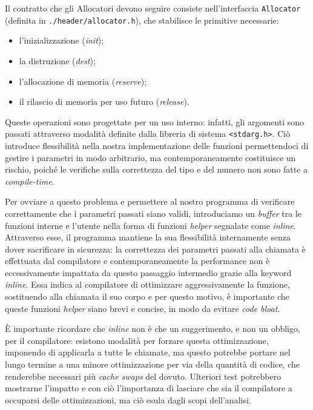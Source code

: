 \documentclass[noexaminfo]{sapthesis}
\begin{document}
Il contratto che gli Allocatori devono seguire consiste nell’interfaccia \texttt{Allocator} (definita in \texttt{./header/allocator.h}), che stabilisce le primitive necessarie:
\begin{itemize}
  \item l’inizializzazione (\textit{init});
  \item la distruzione (\textit{dest});
  \item l’allocazione di memoria (\textit{reserve});
  \item il rilascio di memoria per uso futuro (\textit{release}).
\end{itemize}
Queste operazioni sono progettate per un uso interno: infatti, gli argomenti sono passati attraverso modalità definite dalla libreria di sistema \texttt{<stdarg.h>}. Ciò introduce flessibilità nella nostra implementazione delle funzioni permettendoci di gestire i parametri in modo arbitrario, ma contemporaneamente costituisce un rischio, poiché le verifiche sulla correttezza del tipo e del numero non sono fatte a \textit{compile-time}.

Per ovviare a questo problema e permettere al nostro programma di verificare correttamente che i parametri passati siano validi, introduciamo un \textit{buffer} tra le funzioni interne e l’utente nella forma di funzioni \textit{helper} segnalate come \textit{inline}. Attraverso esse, il programma mantiene la sua flessibilità internamente senza dover sacrificare in sicurezza: la correttezza dei parametri passati alla chiamata è effettuata dal compilatore e contemporaneamente la performance non è eccessivamente impattata da questo passaggio intermedio grazie alla keyword \textit{inline}. Essa indica al compilatore di ottimizzare aggressivamente la funzione, sostituendo alla chiamata il suo corpo e per questo motivo, è importante che queste funzioni \textit{helper} siano brevi e concise, in modo da evitare \textit{code bloat}.

È importante ricordare che \textit{inline} non è che un suggerimento, e non un obbligo, per il compilatore: esistono modalità per forzare questa ottimizzazione, imponendo di applicarla a tutte le chiamate, ma questo potrebbe portare nel lungo termine a una minore ottimizzazione per via della quantità di codice, che renderebbe necessari più \textit{cache swaps} del dovuto. Ulteriori test potrebbero mostrarne l’impatto e con ciò l’importanza di lasciare che sia il compilatore a occuparsi delle ottimizzazioni, ma ciò esula dagli scopi dell’analisi.
\end{document}

